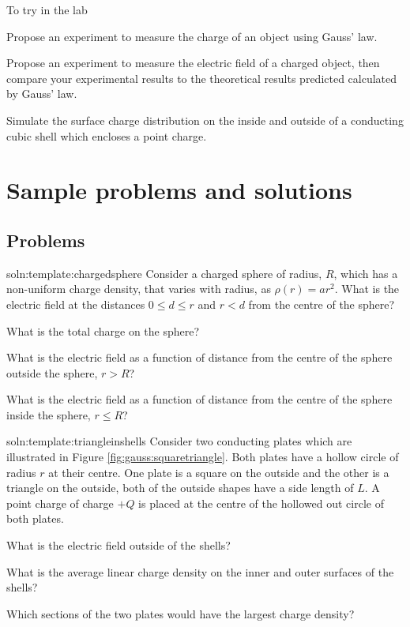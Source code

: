 \begin{chapteractivity}{To try in the lab}
{
\item Propose an experiment to measure the charge of an object using Gauss' law.
\item Propose an experiment to measure the electric field of a charged object, then compare your experimental results to the theoretical results predicted calculated by Gauss' law.
\item Simulate the surface charge distribution on the inside and outside of a conducting cubic shell which encloses a point charge.
}
\end{chapteractivity}

\newpage
\section{Sample problems and solutions}


\subsection{Problems}
\begin{problemParts}{soln:template:chargedsphere}{\label{prob:template:chargedsphere} 
Consider a charged sphere of radius, $R$, which has a non-uniform charge density, that varies with radius, as $\rho(r) = ar^2$. What is the electric field at the distances $0\leq d \leq r$ and $r<d$ from the centre of the sphere? }
{
\item What is the total charge on the sphere?
\item What is the electric field as a function of distance from the centre of the sphere outside the sphere, $r>R$?
\item What is the electric field as a function of distance from the centre of the sphere inside the sphere, $r\leq R$?
}
\end{problemParts}

\begin{problemParts}{soln:template:triangleinshells}{\label{prob:template:triangleinshells} Consider two conducting plates which are illustrated in Figure \ref{fig:gauss:squaretriangle}. Both plates have a hollow circle of radius $r$ at their centre. One plate is a square on the outside and the other is a triangle on the outside, both of the outside shapes have a side length of $L$. A point charge of charge $+Q$ is placed at the centre of the hollowed out circle of both plates.}
{
 \item What is the electric field outside of the shells?
 \item What is the average linear charge density on the inner and outer surfaces of the shells?
 \item Which sections of the two plates would have the largest charge density?
	}

\end{problemParts}



